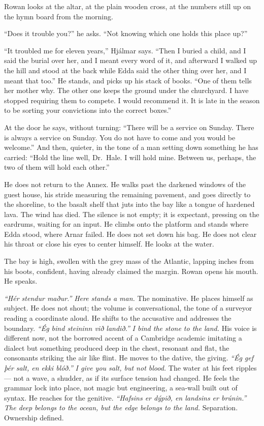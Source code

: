 \documentclass[11pt,oneside]{book}
\newcommand{\sceneline}{%
  \par\vspace{1.2em}
  \begin{center}
    \fontsize{11}{11}\selectfont \textbullet\quad\textbullet\quad\textbullet
  \end{center}
  \vspace{0.6em}\noindent\ignorespaces
}
\begin{document}
Rowan looks at the altar, at the plain wooden cross, at the numbers
still up on the hymn board from the morning.

``Does it trouble you?'' he asks. ``Not knowing which one holds this
place up?''

``It troubled me for eleven years,'' Hjálmar says. ``Then I buried a
child, and I said the burial over her, and I meant every word of it, and
afterward I walked up the hill and stood at the back while Edda said the
other thing over her, and I meant that too.'' He stands, and picks up
his stack of books. ``One of them tells her mother why. The other one
keeps the ground under the churchyard. I have stopped requiring them to
compete. I would recommend it. It is late in the season to be sorting
your convictions into the correct boxes.''

At the door he says, without turning: ``There will be a service on
Sunday. There is always a service on Sunday. You do not have to come and
you would be welcome.'' And then, quieter, in the tone of a man setting
down something he has carried: ``Hold the line well, Dr.~Hale. I will
hold mine. Between us, perhaps, the two of them will hold each other.''

\sceneline

He does not return to the Annex. He walks past the darkened windows of
the guest house, his stride measuring the remaining pavement, and goes
directly to the shoreline, to the basalt shelf that juts into the bay
like a tongue of hardened lava. The wind has died. The silence is not
empty; it is expectant, pressing on the eardrums, waiting for an input.
He climbs onto the platform and stands where Edda stood, where Arnar
failed. He does not set down his bag. He does not clear his throat or
close his eyes to center himself. He looks at the water.

The bay is high, swollen with the grey mass of the Atlantic, lapping
inches from his boots, confident, having already claimed the margin.
Rowan opens his mouth. He speaks.

\emph{``Hér stendur maður.''} \emph{Here stands a man.} The nominative.
He places himself as subject. He does not shout; the volume is
conversational, the tone of a surveyor reading a coordinate aloud. He
shifts to the accusative and addresses the boundary. \emph{``Ég bind
steininn við landið.''} \emph{I bind the stone to the land.} His voice
is different now, not the borrowed accent of a Cambridge academic
imitating a dialect but something produced deep in the chest, resonant
and flat, the consonants striking the air like flint. He moves to the
dative, the giving. \emph{``Ég gef þér salt, en ekki blóð.''} \emph{I
give you salt, but not blood.} The water at his feet ripples --- not a
wave, a shudder, as if its surface tension had changed. He feels the
grammar lock into place, not magic but engineering, a sea-wall built out
of syntax. He reaches for the genitive. \emph{``Hafsins er dýpið, en
landsins er brúnin.''} \emph{The deep belongs to the ocean, but the edge
belongs to the land.} Separation. Ownership defined.
\end{document}
